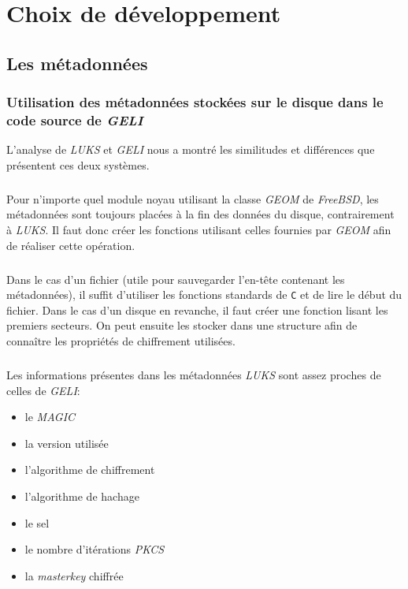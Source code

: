 \chapter{Choix de développement}

\section{Les métadonnées}
\subsection{Utilisation des métadonnées stockées sur le disque dans le code
  source de \textit{GELI}}
\label{ssec:md_usage}
L'analyse de \textit{LUKS} et \textit{GELI} nous a montré les similitudes et
différences que présentent ces deux systèmes.

\paragraph{}
Pour n'importe quel module noyau utilisant la classe \textit{GEOM} de
\textit{FreeBSD}, les métadonnées sont toujours placées à la fin des données du
disque, contrairement à \textit{LUKS}. Il faut donc créer les fonctions
utilisant celles fournies par \textit{GEOM} afin de réaliser cette opération.
\paragraph{}
Dans le cas d'un fichier (utile pour sauvegarder l'en-tête contenant les 
métadonnées), il suffit d'utiliser les fonctions standards de
\verb|C| et de lire le début du fichier. Dans le cas d'un disque en revanche, il
faut créer une fonction lisant les premiers secteurs. On peut ensuite les
stocker dans une structure afin de connaître les propriétés de chiffrement
utilisées.

\paragraph{}
Les informations présentes dans les métadonnées \textit{LUKS} sont assez proches
de celles de \textit{GELI}:
\begin{itemize}
\item le \textit{MAGIC}
\item la version utilisée
\item l'algorithme de chiffrement
\item l'algorithme de hachage
\item le sel
\item le nombre d'itérations \textit{PKCS}
\item la \textit{masterkey} chiffrée
\end{itemize}


